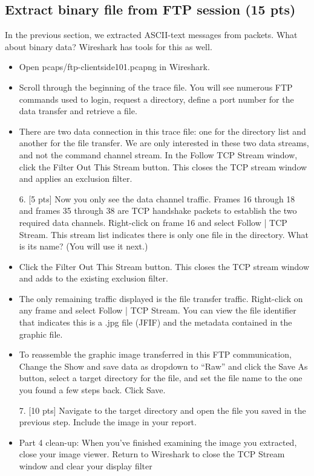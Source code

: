 \subsection{Extract binary file from FTP session (15 pts)}
In the previous section, we extracted ASCII-text messages from packets. What about binary
data? Wireshark has tools for this as well.
\begin{itemize}
\item Open pcaps/ftp-clientside101.pcapng in Wireshark.
\item Scroll through the beginning of the trace file. You will see numerous FTP commands
used to login, request a directory, define a port number for the data transfer and
retrieve a file.
\item There are two data connection in this trace file: one for the directory list and another
for the file transfer. We are only interested in these two data streams, and not the
command channel stream. In the Follow TCP Stream window, click the Filter Out
This Stream button. This closes the TCP stream window and applies an exclusion
filter.
\item[6.] [5 pts] Now you only see the data channel traffic. Frames 16 through 18 and frames 35
through 38 are TCP handshake packets to establish the two required data channels.
Right-click on frame 16 and select Follow | TCP Stream. This stream list indicates
there is only one file in the directory. What is its name? (You will use it next.)
\item Click the Filter Out This Stream button. This closes the TCP stream window and
adds to the existing exclusion filter.
\item The only remaining traffic displayed is the file transfer traffic. Right-click on any frame
and select Follow | TCP Stream. You can view the file identifier that indicates this
is a .jpg file (JFIF) and the metadata contained in the graphic file.
\item To reassemble the graphic image transferred in this FTP communication, Change the
Show and save data as dropdown to “Raw” and click the Save As button, select
a target directory for the file, and set the file name to the one you found a few steps
back. Click Save.
\item[7.] [10 pts] Navigate to the target directory and open the file you saved in the previous
step. Include the image in your report.
\item Part 4 clean-up: When you’ve finished examining the image you extracted, close your
image viewer. Return to Wireshark to close the TCP Stream window and clear your
display filter
\end{itemize}

